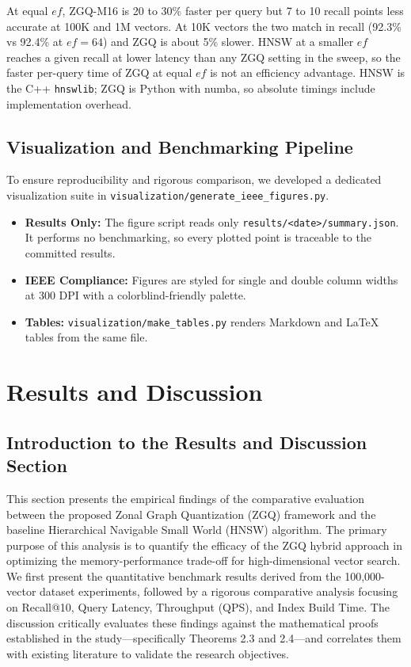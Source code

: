 \documentclass[conference]{IEEEtran}
\begin{document}
At equal $ef$, ZGQ-M16 is 20 to 30\% faster per query but 7 to 10 recall points less accurate at 100K and 1M vectors. At 10K vectors the two match in recall (92.3\% vs 92.4\% at $ef=64$) and ZGQ is about 5\% slower. HNSW at a smaller $ef$ reaches a given recall at lower latency than any ZGQ setting in the sweep, so the faster per-query time of ZGQ at equal $ef$ is not an efficiency advantage. HNSW is the C++ \texttt{hnswlib}; ZGQ is Python with numba, so absolute timings include implementation overhead.

\subsection{Visualization and Benchmarking Pipeline}
To ensure reproducibility and rigorous comparison, we developed a dedicated visualization suite in \texttt{visualization/generate\_ieee\_figures.py}.
\begin{itemize}
    \item \textbf{Results Only:} The figure script reads only \texttt{results/<date>/summary.json}. It performs no benchmarking, so every plotted point is traceable to the committed results.
    \item \textbf{IEEE Compliance:} Figures are styled for single and double column widths at 300 DPI with a colorblind-friendly palette.
    \item \textbf{Tables:} \texttt{visualization/make\_tables.py} renders Markdown and LaTeX tables from the same file.
\end{itemize}

\section{Results and Discussion}

\subsection{Introduction to the Results and Discussion Section}
This section presents the empirical findings of the comparative evaluation between the proposed Zonal Graph Quantization (ZGQ) framework and the baseline Hierarchical Navigable Small World (HNSW) algorithm. The primary purpose of this analysis is to quantify the efficacy of the ZGQ hybrid approach in optimizing the memory-performance trade-off for high-dimensional vector search. We first present the quantitative benchmark results derived from the 100,000-vector dataset experiments, followed by a rigorous comparative analysis focusing on Recall@10, Query Latency, Throughput (QPS), and Index Build Time. The discussion critically evaluates these findings against the mathematical proofs established in the study—specifically Theorems 2.3 and 2.4—and correlates them with existing literature to validate the research objectives.
\end{document}

